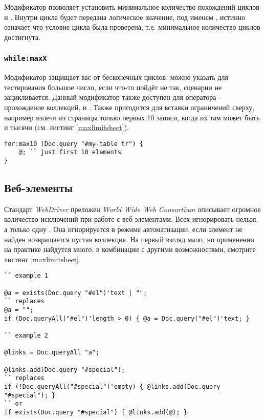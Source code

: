 Модификатор  позволяет установить минимальное количество похождений циклов  и . Внутри цикла будет передана логическое значение, под именем , истинно означает что условие цикла была проверена, т.е. минимальное количество циклов достигнута.

\subsubsection{\lstinline|while:maxX|}

Модификатор  защищает вас от бесконечных циклов, можно указать для тестирования большое число, если что-то пойдёт не так, сценарии не зацикливается. Данный модификатор также доступен для оператора  - прохождение коллекций,  и . Также пригодится для вставки ограничений сверху, например излечи из страницы только первых 10 записи, когда их там может быть и тысячи (см. листинг \ref{maxlimitsheet}).

\begin{lstlisting}[caption=Использование for:maxX, label=maxlimitsheet]
for:max10 (Doc.query "#my-table tr") {
	@; `` just first 10 elements
}
\end{lstlisting}

\subsection{Веб-элементы}

Стандарт \textit{WebDriver} преложен \textit{World Wide Web Consortium} описывает огромное количество исключений при работе с веб-элементами. Всех игнорировать нельзя, а только одну . Она игнорируется в режиме автоматизации, если элемент не найден возвращается пустая коллекция. На первый взгляд мало, но применении на практике найдутся много, в комбинации с другими возможностями, смотрите листинг \ref{maxlimitsheet}.

\begin{lstlisting}[caption=Использование веб-элементов, label=maxlimitsheet]
`` example 1

@a = exists(Doc.query "#el")'text | "";
`` replaces
@a = "";
if (Doc.queryAll("#el")'length > 0) { @a = Doc.query("#el")'text; }

`` example 2

@links = Doc.queryAll "a";

@links.add(Doc.query "#special");
`` replaces
if (!Doc.queryAll("#special")'empty) { @links.add(Doc.query "#special"); }
`` or
if exists(Doc.query "#special") { @links.add(@); }
\end{lstlisting}


